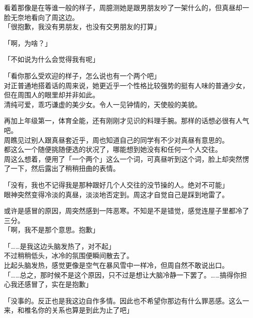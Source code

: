 看着那像是在等谁一般的样子，周臆测她是跟男朋友吵了一架什么的，但真昼却一脸无奈地看向了周这边。\\

「很抱歉，我没有男朋友，也没有交男朋友的打算」

「啊，为啥？」

「不如说为什么会觉得我有呢」

「看你那么受欢迎的样子，怎么说也有一个两个吧」\\

对正普通地搭着话的周来说，她更近乎一个性格比较强势的挺有人味的普通少女，但在周围人的眼里却并非如此。\\

清纯可爱，乖巧谦虚的美少女。令人一见钟情的，天使般的美貌。

再加上年级第一，体育全能，还有刚刚才见识的料理手腕。那样的话想必很有人气吧。\\

周瞧见过别人跟真昼套近乎，周也知道自己的同学有不少对真昼有意思的。\\

都这么一个随便挑随便选的状况了，哪能想到她没有和任何一个人交往。\\

周这么想着，便用了「一个两个」这么一个词，可真昼听到这个词，脸上却突然愣了一下，然后露出了稍稍扭曲的表情。

「没有，我也不记得我是那种跟好几个人交往的没节操的人。绝对不可能」\\

眼神突然变得冷淡的真昼，淡淡地否定到。周这才自觉自己是踩到地雷了。

或许是感冒的原因，周突然感到一阵恶寒。不知是不是错觉，感觉连屋子里都冷了三分。\\

「啊，我不是那个意思。抱歉」

「……是我这边头脑发热了，对不起」\\

不过稍稍低头，冰冷的氛围便瞬间散去了。\\

比起头脑发热，感觉更像是空气在暴风雪中一样冷，但周自然不敢说出口。\\

「……总之，那时候不是这个原因，只不过是想让大脑冷静一下罢了。……搞得你担心我还感冒了，实在是抱歉」

「没事的。反正也是我这边自作多情。因此也不希望你那边有什么罪恶感。这么一来，和椎名你的关系也算是到此为止了吧」\\

